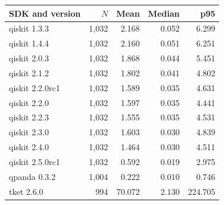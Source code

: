 \par\begin{center}\begin{minipage}{\linewidth}\def\@captype{table}
\centering
\caption{Runtime distribution across successful Benchpress records. Values are seconds; p95 uses the nearest-rank estimator.}
\label{tab:runtime}
\begin{tabular}{lrrrr}
\toprule
SDK and version & $N$ & Mean & Median & p95 \\
\midrule
qiskit 1.3.3 & 1,032 & 2.168 & 0.052 & 6.299 \\
qiskit 1.4.4 & 1,032 & 2.160 & 0.051 & 6.251 \\
qiskit 2.0.3 & 1,032 & 1.868 & 0.044 & 5.451 \\
qiskit 2.1.2 & 1,032 & 1.802 & 0.041 & 4.802 \\
qiskit 2.2.0rc1 & 1,032 & 1.589 & 0.035 & 4.631 \\
qiskit 2.2.0 & 1,032 & 1.597 & 0.035 & 4.441 \\
qiskit 2.2.3 & 1,032 & 1.555 & 0.035 & 4.531 \\
qiskit 2.3.0 & 1,032 & 1.603 & 0.030 & 4.839 \\
qiskit 2.4.0 & 1,032 & 1.464 & 0.030 & 4.511 \\
qiskit 2.5.0rc1 & 1,032 & 0.592 & 0.019 & 2.975 \\
qpanda 0.3.2 & 1,004 & 0.222 & 0.010 & 0.746 \\
tket 2.6.0 & 994 & 70.072 & 2.130 & 224.705 \\
\bottomrule
\end{tabular}
\end{minipage}\end{center}\par
